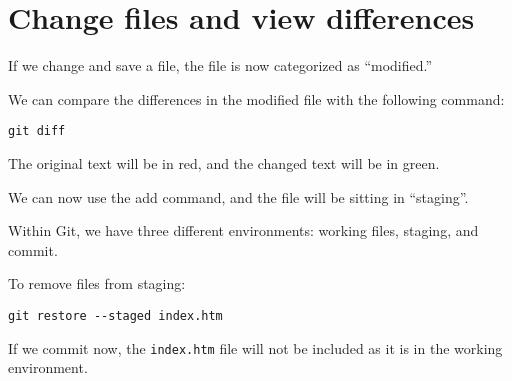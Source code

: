 \documentclass[12pt]{article}
\begin{document}
\section{Change files and view differences}
If we change and save a file, the file is now categorized as ``modified.''\par
We can compare the differences in the modified file with the following command:
\begin{Verbatim}
git diff
\end{Verbatim}
The original text will be in red, and the changed text will be in green.\par
We can now use the add command, and the file will be sitting in ``staging''.\par
Within Git, we have three different environments: working files, staging, and commit.
\begin{figure}[h!]
\centering
{}
\end{figure}
\par
To remove files from staging:
\begin{Verbatim}
git restore --staged index.htm
\end{Verbatim}
If we commit now, the \verb|index.htm| file will not be included as it is in the working environment.
\end{document}
